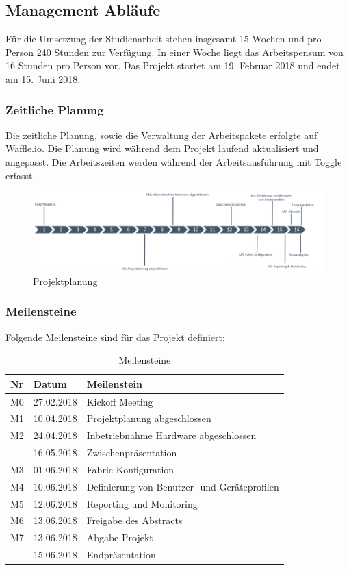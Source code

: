 \subsection{Management Abläufe}
Für die Umsetzung der Studienarbeit stehen insgesamt 15 Wochen und pro Person 240 Stunden zur Verfügung. In einer Woche liegt das Arbeitspensum von 16 Stunden pro Person vor. Das Projekt startet am 19. Februar 2018 und endet am 15. Juni 2018.

\subsubsection{Zeitliche Planung}
Die zeitliche Planung, sowie die Verwaltung der Arbeitspakete erfolgte auf Waffle.io. Die Planung wird während dem Projekt laufend aktualisiert und angepasst. Die Arbeitszeiten werden während der Arbeitsausführung mit Toggle erfasst.

\begin{figure}[H]
	\centering
	\includegraphics[width=16cm]{img/ZeitlichePlanung_v4.png}
	\caption{Projektplanung}
	\label{fig:Projektplanung}
\end{figure} 

\subsubsection{Meilensteine}
Folgende Meilensteine sind für das Projekt definiert:
\begin{table}[H]
	\centering
	\begin{tabularx}{\textwidth}{p{1cm}| p{2.5cm}| X}
		\rowcolor{gray!50}
		\textbf{Nr} & \textbf{Datum} & \textbf{Meilenstein} \\
		\hline	
		M0 & 27.02.2018 & Kickoff Meeting \\
		M1 & 10.04.2018 & Projektplanung abgeschlossen \\
		M2 & 24.04.2018 & Inbetriebnahme Hardware abgeschlossen \\
		& 16.05.2018 & Zwischenpräsentation \\
		M3 & 01.06.2018 & Fabric Konfiguration \\
		M4 & 10.06.2018 & Definierung von Benutzer- und Geräteprofilen \\
		M5 & 12.06.2018 & Reporting und Monitoring \\
		M6 & 13.06.2018 & Freigabe des Abstracts \\
		M7 & 13.06.2018 & Abgabe Projekt \\
		& 15.06.2018 & Endpräsentation \\
	\end{tabularx}
	\caption{Meilensteine}
	\label{tab:Meilensteine}
\end{table}


